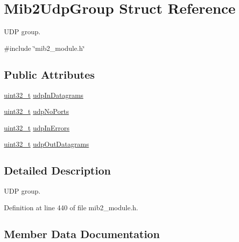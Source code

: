 \hypertarget{structMib2UdpGroup}{}\section{Mib2\+Udp\+Group Struct Reference}
\label{structMib2UdpGroup}


U\+DP group.  




{\ttfamily \#include \char`\"{}mib2\+\_\+module.\+h\char`\"{}}

\subsection*{Public Attributes}
\begin{DoxyCompactItemize}
\item 
\hyperlink{stdint_8h_a435d1572bf3f880d55459d9805097f62}{uint32\+\_\+t} \hyperlink{structMib2UdpGroup_a15ccd5fb93a736ef265eea19c970cbef}{udp\+In\+Datagrams}
\item 
\hyperlink{stdint_8h_a435d1572bf3f880d55459d9805097f62}{uint32\+\_\+t} \hyperlink{structMib2UdpGroup_aabbaf766fb874d55202ccb7152a92de6}{udp\+No\+Ports}
\item 
\hyperlink{stdint_8h_a435d1572bf3f880d55459d9805097f62}{uint32\+\_\+t} \hyperlink{structMib2UdpGroup_a4eb62a75eb25a63961d965e010b01653}{udp\+In\+Errors}
\item 
\hyperlink{stdint_8h_a435d1572bf3f880d55459d9805097f62}{uint32\+\_\+t} \hyperlink{structMib2UdpGroup_a9ca4aa4e3230b318210bf1a9e13104ac}{udp\+Out\+Datagrams}
\end{DoxyCompactItemize}


\subsection{Detailed Description}
U\+DP group. 

Definition at line 440 of file mib2\+\_\+module.\+h.



\subsection{Member Data Documentation}
\mbox{\label{structMib2UdpGroup_a15ccd5fb93a736ef265eea19c970cbef}} 
